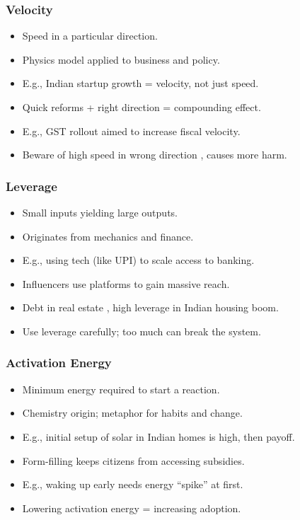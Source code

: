 \begin{frame}[fragile]\frametitle{Velocity}
  \begin{itemize}
    \item Speed in a particular direction.
    \item Physics model applied to business and policy.
    \item E.g., Indian startup growth = velocity, not just speed.
    \item Quick reforms + right direction = compounding effect.
    \item E.g., GST rollout aimed to increase fiscal velocity.
    \item Beware of high speed in wrong direction , causes more harm.
  \end{itemize}
\end{frame}

\begin{frame}[fragile]\frametitle{Leverage}
  \begin{itemize}
    \item Small inputs yielding large outputs.
    \item Originates from mechanics and finance.
    \item E.g., using tech (like UPI) to scale access to banking.
    \item Influencers use platforms to gain massive reach.
    \item Debt in real estate , high leverage in Indian housing boom.
    \item Use leverage carefully; too much can break the system.
  \end{itemize}
\end{frame}

\begin{frame}[fragile]\frametitle{Activation Energy}
  \begin{itemize}
    \item Minimum energy required to start a reaction.
    \item Chemistry origin; metaphor for habits and change.
    \item E.g., initial setup of solar in Indian homes is high, then payoff.
    \item Form-filling keeps citizens from accessing subsidies.
    \item E.g., waking up early needs energy ``spike'' at first.
    \item Lowering activation energy = increasing adoption.
  \end{itemize}
\end{frame}

